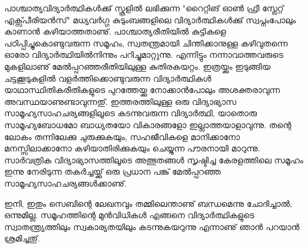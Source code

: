 പാശ്ചാത്യവിദ്യാര്‍ത്ഥികള്‍ക്കു് സ്കൂളില്‍ ലഭിക്കുന്ന "റൈറ്റിങ് ഓണ്‍ ഫ്രീ സ്ലേറ്റ് എക്സ്പീരിയന്‍സ്" മധ്യവര്‍ഗ്ഗ കുടുംബങ്ങളിലെ വിദ്യാര്‍ത്ഥികള്‍ക്കു് സ്വപ്നംപോലും കാണാന്‍ കഴിയാത്തതാണു്. പാശ്ചാത്യരീതിയില്‍ കുട്ടികളെ പഠിപ്പിച്ചുകൊണ്ടുവരുന്ന സമൂഹം, സ്വതന്ത്രമായി ചിന്തിക്കാനുള്ള കഴിവുതന്നെ ഓരോ വിദ്യാര്‍ത്ഥിയില്‍നിന്നും പറിച്ചുമാറ്റുന്നു. എന്നിട്ടും നന്നാവാത്തവരുടെ മുകളിലാണു് മേല്‍പ്പറഞ്ഞരീതിയിലുള്ള കുതിരകയറ്റം. ഇത്രയ്ക്കും ഇടുങ്ങിയ ചട്ടക്കൂടുകളില്‍ വളര്‍ത്തിക്കൊണ്ടുവരുന്ന വിദ്യാര്‍ത്ഥികള്‍ യാഥാസ്ഥിതികരീതികളുടെ പുറത്തേയ്ക്കു നോക്കാന്‍പോലും അശക്തരാവുന്ന അവസ്ഥയാണുണ്ടാവുന്നതു്. ഇത്തരത്തിലുള്ള ഒരു വിദ്യാഭ്യാസ സാമൂഹ്യസാഹചര്യങ്ങളിലൂടെ കടന്നുവരുന്ന വിദ്യാര്‍ത്ഥി, യാതൊരു സാമൂഹ്യബോധമോ ബാധ്യതയോ വികാരങ്ങളോ ഇല്ലാത്തയാളാവുന്നു. തന്റെ ലോകം തന്നിലേക്കു ചുരുക്കുകയും, സഹജീവികളെ മാനിക്കാനോ മനസ്സിലാക്കാനോ കഴിയാതിരിക്കുകയും ചെയ്യുന്ന പൗരനായി മാറുന്നു. സാര്‍വത്രിക വിദ്യാഭ്യാസത്തിലൂടെ അത്ഭുതങ്ങള്‍ സൃഷ്ടിച്ച കേരളത്തിലെ സമൂഹം ഇന്നു നേരിടുന്ന തകര്‍ച്ചയ്ക്കു് ഒരു പ്രധാന പങ്കു് മേല്‍പ്പറഞ്ഞ സാമൂഹ്യസാഹചര്യങ്ങള്‍ക്കാണു്.

ഇനി, ഇതും സെബിന്റെ ലേഖനവും തമ്മിലെന്താണു് ബന്ധമെന്നു ചോദിച്ചാല്‍, ഒന്നുമില്ല. സമൂഹത്തിന്റെ മുന്‍വിധികള്‍ എങ്ങനെ വിദ്യാര്‍ത്ഥികളുടെ സ്വാതന്ത്ര്യത്തിലും സ്വകാര്യതയിലും കടന്നുകയറുന്നു എന്നാണു് ഞാന്‍ പറയാന്‍ ശ്രമിച്ചതു്.

\newpage
